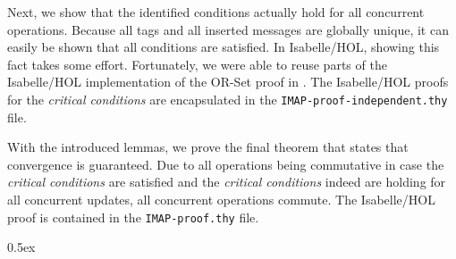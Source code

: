 \documentclass[11pt,a4paper,DIV=11]{article}
\begin{document}
Next, we show that the identified conditions actually hold for all concurrent
operations. Because all tags and all inserted messages are globally unique, it can
easily be shown that all conditions are satisfied. In Isabelle/HOL, showing this fact
takes some effort. Fortunately, we were able to reuse parts of the Isabelle/HOL implementation
of the OR-Set proof in \cite{gomes_crdtafp}. The Isabelle/HOL proofs for the
\textit{critical conditions} are encapsulated in the \texttt{IMAP-proof-independent.thy} file.

With the introduced lemmas, we prove the final theorem that states that convergence
is guaranteed. Due to all operations being commutative in case the \textit{critical conditions}
are satisfied and the \textit{critical conditions} indeed are holding for all concurrent updates,
all concurrent operations commute. The Isabelle/HOL proof is contained in the
\texttt{IMAP-proof.thy} file.

\parindent 0pt\parskip 0.5ex





\end{document}
